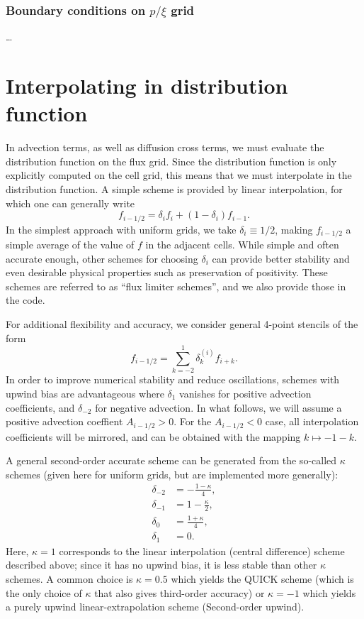 \documentclass{notes}
\begin{document}
	\subsubsection{Boundary conditions on $p/\xi$ grid}
	\ldots

    \section{Interpolating in distribution function}\label{sec:interp}
    In advection terms, as well as diffusion cross terms, we must evaluate the
    distribution function on the flux grid. Since the distribution function is
    only explicitly computed on the cell grid, this means that we must
    interpolate in the distribution function. A simple scheme is provided by 
    linear interpolation, for which one can generally write
    \begin{equation}
        f_{i-1/2} = \delta_{i} f_i + \left( 1 - \delta_i \right) f_{i-1}.
    \end{equation}
    In the simplest approach with uniform grids, we take $\delta_i\equiv 1/2$, making $f_{i-1/2}$
    a simple average of the value of $f$ in the adjacent cells. While simple and
    often accurate enough, other schemes for choosing $\delta_i$ can provide
    better stability and even desirable physical properties such as preservation
    of positivity. These schemes are referred to as ``flux limiter schemes'',
    and we also provide those in the code.
    
    For additional flexibility and accuracy, we consider general 4-point stencils of the form
    \begin{equation}
    	f_{i-1/2} = \sum_{k=-2}^1 \delta^{(i)}_k f_{i+k}.
    \end{equation}
    In order to improve numerical stability and reduce oscillations, schemes with 
    upwind bias are advantageous where $\delta_{1}$ vanishes for positive 
    advection coefficients, and $\delta_{-2}$ for negative advection. In what follows,
    we will assume a positive advection coeffient $A_{i-1/2}>0$. For the $A_{i-1/2}<0$ 
    case, all interpolation coefficients will be mirrored, and can be obtained with the 
    mapping $k \mapsto -1 - k$.
    
    A general second-order accurate scheme can be generated from the so-called
    $\kappa$ schemes (given here for uniform grids, but are implemented more generally):
    \begin{align*}
    \delta_{-2} &= -\frac{1-\kappa}{4}, \nonumber \\
    \delta_{-1} &= 1 - \frac{\kappa}{2}, \nonumber \\
    \delta_0 &= \frac{1+\kappa}{4}, \nonumber \\
    \delta_1 &= 0.
    \end{align*}
    Here, $\kappa = 1$ corresponds to the linear interpolation (central difference) 
    scheme described above; since it has no upwind bias, it is less stable than other 
    $\kappa$ schemes. A common choice is $\kappa=0.5$ which yields the QUICK 
    scheme (which is the only choice of $\kappa$ that also gives third-order accuracy) 
    or $\kappa=-1$ which yields a purely upwind linear-extrapolation scheme (Second-order upwind).
\end{document}
